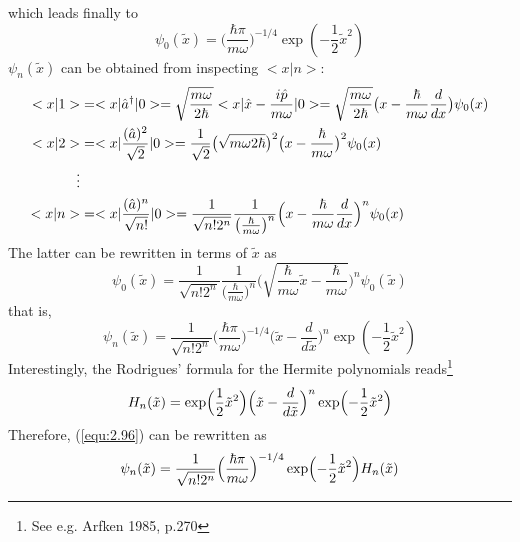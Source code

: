 which leads finally to
\begin{equation}
  \psi_0 (\tilde{x}) =
  \bigl(\frac{\hbar\pi}{m\omega}\bigr)^{-1/4}
  \exp(-\frac{1}{2}\tilde{x}^2)
  \label{equ:2.93}
\end{equation}
$\psi_n(\tilde{x})$ can be obtained from inspecting $<x|n>$:
  \begin{alignat}{2}
    <x|1> &= <x|\hat{a}^{\dagger}|0> =
    \sqrt{\frac{m\omega}{2\hbar}}
    <x|\hat{x}-\frac{i\hat{p}}{m\omega}|0> =
    \sqrt{\frac{m\omega}{2\hbar}}\bigl(x -
    \frac{\hbar}{m\omega}\frac{d}{dx}\bigr) \psi_0(x)
    \nonumber \\
    <x|2> &= <x|\frac{(\hat{a})^2}{\sqrt{2}}|0> =
    \frac{1}{\sqrt{2}}\bigl(\sqrt{{m\omega}{2\hbar}}\bigr)^2\bigl(x
      - \frac{\hbar}{m\omega}\bigr)^2 \psi_0(x) \nonumber \\
      \vdots\nonumber \\
      <x|n> &= 
      <x|\frac{(\hat{a})^n}{\sqrt{n!}}|0> =
      \frac{1}{\sqrt{n!2^n}}
      \frac{1}{\bigl(\frac{\hbar}{m\omega}\bigr)^n}
      \Bigl(x - \frac{\hbar}{m\omega}\frac{d}{dx}\Bigr)^n \psi_0(x)
     \label{equ:2.94}
  \end{alignat}
The latter can be rewritten in terms of $\tilde{x}$ as
\begin{equation}
  \psi_0(\tilde{x}) =
  \frac{1}{\sqrt{n!2^n}}
  \frac{1}{\bigl(\frac{\hbar}{m\omega}\bigr)^n}
  \biggl(
  \sqrt{\frac{\hbar}{m\omega}\tilde{x}-\frac{\hbar}{m\omega}}
  \biggr)^n \psi_0(\tilde{x})
  \label{equ:2.95}
\end{equation}
that is,
\begin{equation}
  \psi_n(\tilde{x}) = \frac{1}{\sqrt{n!2^n}}
  \bigl(
  \frac{\hbar\pi}{m\omega}
  \bigr)^{-1/4}
  \bigl(\tilde{x}-\frac{d}{d\tilde{x}}\bigr)^n
  \exp(-\frac{1}{2}\tilde{x}^2)
  \label{equ:2.96}
\end{equation}
Interestingly, the Rodrigues' formula for the Hermite
polynomials reads\footnote{See e.g. Arfken 1985, p.270}
\begin{equation}
  H_n(\tilde{x}) = \exp\Bigl(\frac{1}{2}\tilde{x}^2\Bigr)
  \Bigl(\tilde{x}-\frac{d}{d\tilde{x}}\Bigr)^n
  \exp\Bigl(-\frac{1}{2}\tilde{x}^2\Bigr)
  \label{equ:2.97}
\end{equation}
Therefore, (\ref{equ:2.96}) can be rewritten as
\begin{equation}
  \psi_n(\tilde{x}) = \frac{1}{\sqrt{n!2^n}}
  \Bigl(
    \frac{\hbar \pi}{m\omega}
    \Bigr)^{-1/4}
    \exp\Bigl(-\frac{1}{2}\tilde{x}^2\Bigr)
    H_n(\tilde{x})
  \label{equ:2.98}
\end{equation}
